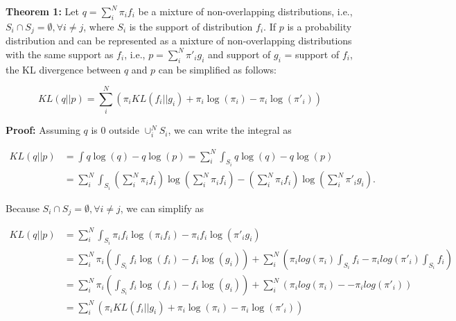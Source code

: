 \textbf{Theorem 1:}
%
Let $q = \sum^{N}_i \pi_i f_i$ be a mixture of non-overlapping distributions, i.e., $S_i \cap S_j = \emptyset, \forall i \neq j$, where $S_i$ is the support of distribution $f_i$.
%
If $p$ is a probability distribution and can be represented as a mixture of non-overlapping distributions with the same support as $f_i$, i.e., $p = \sum^{N}_i \pi'_i g_i$ and support of $g_i$ = support of $f_i$, the KL divergence between $q$ and $p$ can be simplified as follows:

\begin{equation}
KL(q || p) = \sum^N_i \left( \pi_i KL (f_i || g_i) + \pi_i \log (\pi_i) - \pi_i \log(\pi'_i) \right)
\end{equation}

%

%
\textbf{Proof:} 
Assuming $q$ is $0$ outside $\cup^N_i S_i$, we can write the integral as

\begin{align}
    KL (q || p) &= \int q \log (q) - q \log (p) = \sum^N_i \int_{S_i} q \log (q) - q \log (p) \nonumber \\
    &= \sum^N_i \int_{S_i} \left(\sum^{N}_i \pi_i f_i \right)\log \left(\sum^{N}_i \pi_i f_i\right) - \left( \sum^{N}_i \pi_i f_i\right) \log \left(\sum^{N}_i \pi'_i g_i\right).
\end{align}

Because $S_i \cap S_j = \emptyset, \forall i \neq j$, we can simplify as

\begin{align}
   KL (q || p) &=  \sum^N_i \int_{S_i} \pi_i f_i \log(\pi_i f_i) - \pi_i f_i \log(\pi'_i g_i) \nonumber \\
   &= \sum^N_i \pi_i \left( \int_{S_i} f_i \log(f_i) -  f_i \log(g_i) \right) + \sum^N_i \left( \pi_i log (\pi_i) \int_{S_i} f_i - \pi_i log (\pi'_i) \int_{S_i} f_i \right) \nonumber \\
   &= \sum^N_i \pi_i \left( \int_{S_i} f_i \log(f_i) -  f_i \log(g_i) \right) + \sum^N_i \left(\pi_i log (\pi_i) - - \pi_i log (\pi'_i) \right) \nonumber \\
   &= \sum^N_i \left( \pi_i KL (f_i || g_i) + \pi_i \log (\pi_i) - \pi_i \log(\pi'_i) \right)
\end{align}

